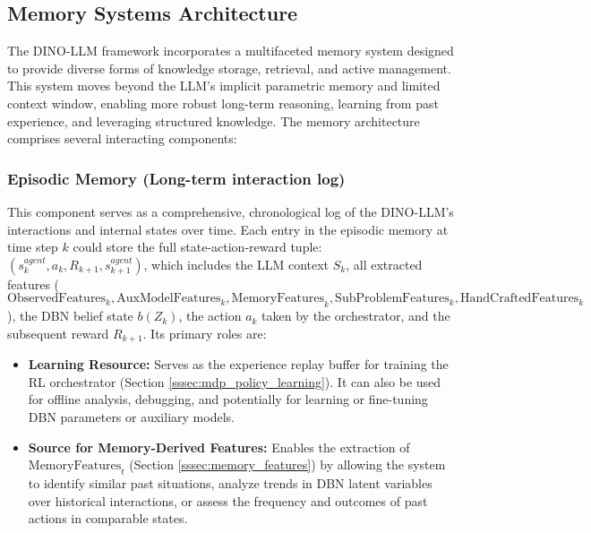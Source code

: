 \documentclass[11pt]{article}
\begin{document}
\subsection{Memory Systems Architecture}
\label{ssec:memory_systems}

The DINO-LLM framework incorporates a multifaceted memory system designed to provide diverse forms of knowledge storage, retrieval, and active management. This system moves beyond the LLM's implicit parametric memory and limited context window, enabling more robust long-term reasoning, learning from past experience, and leveraging structured knowledge. The memory architecture comprises several interacting components:

\subsubsection{Episodic Memory (Long-term interaction log)}
\label{sssec:episodic_memory}
This component serves as a comprehensive, chronological log of the DINO-LLM's interactions and internal states over time. Each entry in the episodic memory at time step $k$ could store the full state-action-reward tuple: $(s_k^{agent}, a_k, R_{k+1}, s_{k+1}^{agent})$, which includes the LLM context $S_k$, all extracted features ($\text{ObservedFeatures}_k, \text{AuxModelFeatures}_k, \text{MemoryFeatures}_k, \text{SubProblemFeatures}_k, \text{HandCraftedFeatures}_k$), the DBN belief state $b(Z_k)$, the action $a_k$ taken by the orchestrator, and the subsequent reward $R_{k+1}$.
Its primary roles are:
\begin{itemize}
    \item \textbf{Learning Resource:} Serves as the experience replay buffer for training the RL orchestrator (Section \ref{sssec:mdp_policy_learning}). It can also be used for offline analysis, debugging, and potentially for learning or fine-tuning DBN parameters or auxiliary models.
    \item \textbf{Source for Memory-Derived Features:} Enables the extraction of $\text{MemoryFeatures}_t$ (Section \ref{sssec:memory_features}) by allowing the system to identify similar past situations, analyze trends in DBN latent variables over historical interactions, or assess the frequency and outcomes of past actions in comparable states.
\end{itemize}
\end{document}
